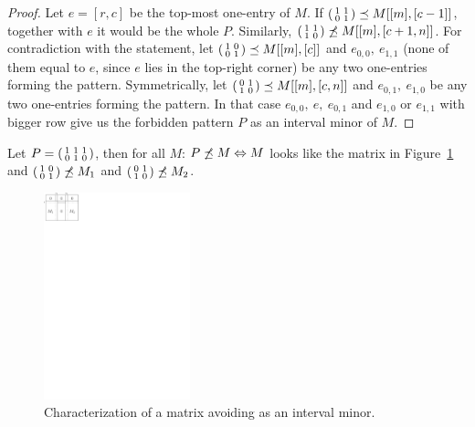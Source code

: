 \begin{proof}
Let $e=[r,c]$ be the top-most one-entry of $M$. If $\left(\begin{smallmatrix}1&1\\0&1\end{smallmatrix}\right)\preceq M[[m],[c-1]]$, together with $e$ it would be the whole $P$. Similarly, $\left(\begin{smallmatrix}1&1\\1&0\end{smallmatrix}\right)\not\preceq M[[m],[c+1,n]]$. For contradiction with the statement, let $\left(\begin{smallmatrix}1&0\\0&1\end{smallmatrix}\right)\preceq M[[m],[c]]$ and $e_{0,0},\ e_{1,1}$ (none of them equal to $e$, since $e$ lies in the top-right corner) be any two one-entries forming the pattern. Symmetrically, let $\left(\begin{smallmatrix}0&1\\1&0\end{smallmatrix}\right)\preceq M[[m],[c,n]]$ and $e_{0,1},\ e_{1,0}$ be any two one-entries forming the pattern. In that case $e_{0,0},\ e,\ e_{0,1}$ and $e_{1,0}$ or $e_{1,1}$ with bigger row give us the forbidden pattern $P$ as an interval minor of $M$.
\end{proof}
\begin{thm}
Let $P=\left(\begin{smallmatrix}1&1&1\\0&1&0\end{smallmatrix}\right)$, then for all $M$: $P\not\preceq M\Leftrightarrow M$ looks like the matrix in Figure~\ref{p72} and $\left(\begin{smallmatrix}1&0\\0&1\end{smallmatrix}\right)\not\preceq M_1$ and $\left(\begin{smallmatrix}0&1\\1&0\end{smallmatrix}\right)\not\preceq M_2$.
\end{thm}
\begin{figure}[h!]
\centering
\includegraphics[height=60mm]{img/p72.pdf}
\caption{Characterization of a matrix avoiding \usebox{\smlmatb} as an interval minor.}
\label{p72}
\end{figure}
